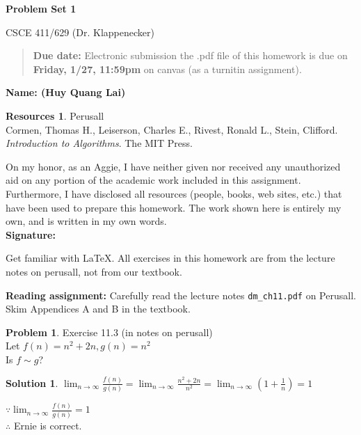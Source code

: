 \documentclass{article}
\theoremstyle{definition}
\newtheorem{problem}{Problem}
\newtheorem*{solution}{Solution}
\newtheorem*{resources}{Resources}
\newcommand{\name}[1]{\noindent\textbf{Name: #1}}
\newcommand{\honor}{\noindent On my honor, as an Aggie, I have neither
  given nor received any unauthorized aid on any portion of the
  academic work included in this assignment. Furthermore, I have
  disclosed all resources (people, books, web sites, etc.) that have
  been used to prepare this homework. The work shown here is entirely
  my own, and is written in my own words.\\[1ex]
 \textbf{Signature:} \underline{\hspace*{5cm}} }
\newcommand{\problemset}[1]{\begin{center}\textbf{Problem Set #1}\end{center}}
\newcommand{\duedate}[1]{\begin{quote}\textbf{Due date:} Electronic
    submission the .pdf file of this homework is due on \textbf{#1} on canvas
    (as a turnitin assignment).\end{quote}}
\begin{document}
\problemset{1}
\centerline{CSCE 411/629 (Dr. Klappenecker) }

\duedate{Friday, 1/27, 11:59pm}
\name{ (Huy Quang Lai)}
\begin{resources}
Perusall\\
Cormen, Thomas H., Leiserson, Charles E., Rivest, Ronald L., Stein, Clifford. \textit{Introduction to Algorithms}. The MIT Press.
\end{resources}
\honor

\newpage%
\noindent Get familiar with \LaTeX. All exercises in this homework are from the lecture
notes on perusall, not from our textbook. \medskip

\noindent\textbf{Reading assignment:} Carefully read the lecture notes
\verb|dm_ch11.pdf| on Perusall. Skim Appendices A and B in the textbook. 

\begin{problem}
Exercise 11.3 (in notes on perusall)\\
Let $f(n)=n^2+2n,g(n)=n^2$\\
Is $f\sim g$?
\begin{solution}
$\displaystyle\lim_{n\to\infty}\frac{f(n)}{g(n)}=\lim_{n\to\infty}\frac{n^2+2n}{n^2}=\lim_{n\to\infty}\left(1+\frac{1}{n}\right)=1$

\noindent
$\displaystyle\because\lim_{n\to\infty}\frac{f(n)}{g(n)}=1$\\
$\therefore$ Ernie is correct.
\end{solution}
\end{problem}
\end{document}
